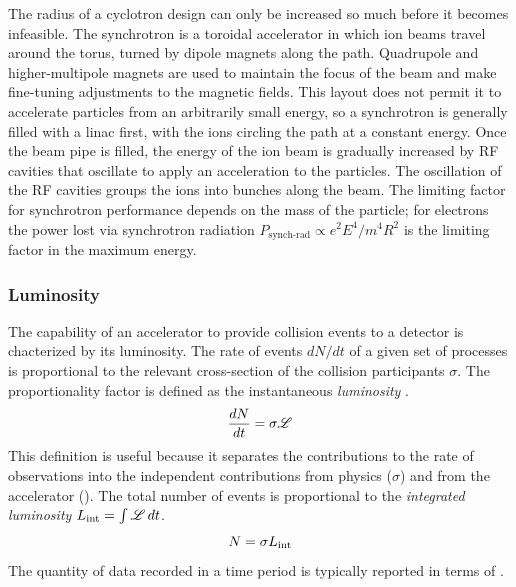 The radius of a cyclotron design can only be increased so much before it becomes infeasible.
The synchrotron is a toroidal accelerator in which ion beams travel around the torus, turned by dipole magnets along the path.
Quadrupole and higher-multipole magnets are used to maintain the focus of the beam and make fine-tuning adjustments to the magnetic fields.
This layout does not permit it to accelerate particles from an arbitrarily small energy, so a synchrotron is generally filled with a linac first, with the ions circling the path at a constant energy.
Once the beam pipe is filled, the energy of the ion beam is gradually increased by RF cavities that oscillate to apply an acceleration to the particles.
The oscillation of the RF cavities groups the ions into bunches along the beam.
The limiting factor for synchrotron performance depends on the mass of the particle; for electrons the power lost via synchrotron radiation $P_\textrm{synch-rad} \propto e^2 E^4 / m^4 R^2 $ is the limiting factor in the maximum energy.

\subsubsection{Luminosity}

The capability of an accelerator to provide collision events to a detector is chacterized by its luminosity.
The rate of events $dN/dt$ of a given set of processes is proportional to the relevant cross-section of the collision participants $\sigma$.
The proportionality factor is defined as the instantaneous \emph{luminosity} \Lumi.
\begin{equation}
\label{eq:rate_lumi}
\frac{dN}{dt} = \sigma \mathscr{L}
\end{equation}
This definition is useful because it separates the contributions to the rate of observations into the independent contributions from physics ($\sigma$) and from the accelerator (\Lumi).
The total number of events is proportional to the \emph{integrated luminosity} $L_\mathrm{int} = \int \mathscr{L} \, dt$.
\begin{equation}
N = \sigma L_\mathrm{int}
\end{equation}
The quantity of data recorded in a time period is typically reported in terms of \Lint.


